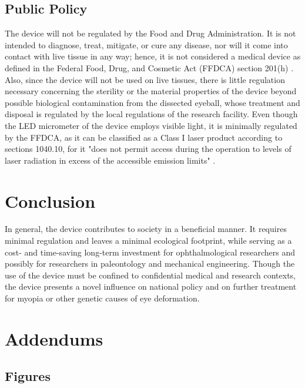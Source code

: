 \documentclass{article}
\begin{document}
 
\subsection{Public Policy}
\label{sec:Public Policy}
 
The device will not be regulated by the Food and Drug
Administration. It is not intended to diagnose, treat, mitigate, or
cure any disease, nor will it come into contact with live tissue in
any way; hence, it is not considered a medical device as defined in
the Federal Food, Drug, and Cosmetic Act (FFDCA) section 201(h)
\cite{fdaguidelines}. Also, since the device will not be used on live
tissues, there is little regulation necessary concerning the sterility
or the material properties of the device beyond possible biological
contamination from the dissected eyeball, whose treatment and disposal
is regulated by the local regulations of the research facility.  Even
though the LED micrometer of the device employs visible light, it is
minimally regulated by the FFDCA, as it can be classified as a Class I
laser product according to sections 1040.10, for it "does not permit
access during the operation to levels of laser radiation in excess of
the accessible emission limits" \cite{fdaguidelines}.
 
 
\section{Conclusion}
\label{sec:Conclusion}

In general, the device contributes to society in a beneficial
manner. It requires minimal regulation and leaves a minimal ecological
footprint, while serving as a cost- and time-saving long-term
investment for ophthalmological researchers and possibly for
researchers in paleontology and mechanical engineering.  Though the
use of the device must be confined to confidential medical and
research contexts, the device presents a novel influence on national
policy and on further treatment for myopia or other genetic causes of
eye deformation.

\section{Addendums}
\label{sec:addendums}

\subsection{Figures}
\label{sec:figures}
\end{document}
